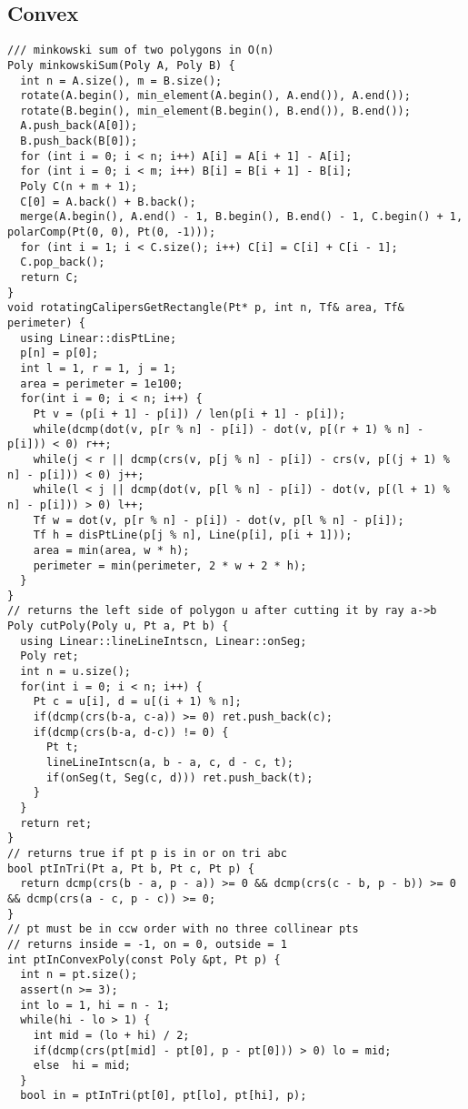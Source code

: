 \documentclass[FSZ,a4paper,onesided]{article}
\begin{document}
\begin{multicols*}{\COLS}
\subsection{Convex}
\begin{lstlisting}
/// minkowski sum of two polygons in O(n)
Poly minkowskiSum(Poly A, Poly B) {
  int n = A.size(), m = B.size();
  rotate(A.begin(), min_element(A.begin(), A.end()), A.end());
  rotate(B.begin(), min_element(B.begin(), B.end()), B.end());
  A.push_back(A[0]);
  B.push_back(B[0]);
  for (int i = 0; i < n; i++) A[i] = A[i + 1] - A[i];
  for (int i = 0; i < m; i++) B[i] = B[i + 1] - B[i];
  Poly C(n + m + 1);
  C[0] = A.back() + B.back();
  merge(A.begin(), A.end() - 1, B.begin(), B.end() - 1, C.begin() + 1, polarComp(Pt(0, 0), Pt(0, -1)));
  for (int i = 1; i < C.size(); i++) C[i] = C[i] + C[i - 1];
  C.pop_back();
  return C;
}
void rotatingCalipersGetRectangle(Pt* p, int n, Tf& area, Tf& perimeter) {
  using Linear::disPtLine;
  p[n] = p[0];
  int l = 1, r = 1, j = 1;
  area = perimeter = 1e100;
  for(int i = 0; i < n; i++) {
    Pt v = (p[i + 1] - p[i]) / len(p[i + 1] - p[i]);
    while(dcmp(dot(v, p[r % n] - p[i]) - dot(v, p[(r + 1) % n] - p[i])) < 0) r++;
    while(j < r || dcmp(crs(v, p[j % n] - p[i]) - crs(v, p[(j + 1) % n] - p[i])) < 0) j++;
    while(l < j || dcmp(dot(v, p[l % n] - p[i]) - dot(v, p[(l + 1) % n] - p[i])) > 0) l++;
    Tf w = dot(v, p[r % n] - p[i]) - dot(v, p[l % n] - p[i]);
    Tf h = disPtLine(p[j % n], Line(p[i], p[i + 1]));
    area = min(area, w * h);
    perimeter = min(perimeter, 2 * w + 2 * h);
  }
}
// returns the left side of polygon u after cutting it by ray a->b
Poly cutPoly(Poly u, Pt a, Pt b) {
  using Linear::lineLineIntscn, Linear::onSeg;
  Poly ret;
  int n = u.size();
  for(int i = 0; i < n; i++) {
    Pt c = u[i], d = u[(i + 1) % n];
    if(dcmp(crs(b-a, c-a)) >= 0) ret.push_back(c);
    if(dcmp(crs(b-a, d-c)) != 0) {
      Pt t;
      lineLineIntscn(a, b - a, c, d - c, t);
      if(onSeg(t, Seg(c, d))) ret.push_back(t);
    }
  }
  return ret;
}
// returns true if pt p is in or on tri abc
bool ptInTri(Pt a, Pt b, Pt c, Pt p) {
  return dcmp(crs(b - a, p - a)) >= 0 && dcmp(crs(c - b, p - b)) >= 0 && dcmp(crs(a - c, p - c)) >= 0;
}
// pt must be in ccw order with no three collinear pts
// returns inside = -1, on = 0, outside = 1
int ptInConvexPoly(const Poly &pt, Pt p) {
  int n = pt.size();
  assert(n >= 3);
  int lo = 1, hi = n - 1;
  while(hi - lo > 1) {
    int mid = (lo + hi) / 2;
    if(dcmp(crs(pt[mid] - pt[0], p - pt[0])) > 0) lo = mid;
    else  hi = mid;
  }
  bool in = ptInTri(pt[0], pt[lo], pt[hi], p);

\end{lstlisting}
\end{multicols*}
\end{document}
